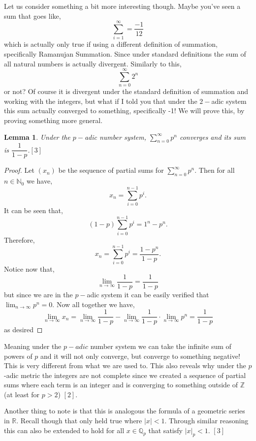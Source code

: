 \documentclass[12pt]{article}
\newtheorem{lem}[thm]{Lemma}
\theoremstyle{definition}
\theoremstyle{remark}
\newcommand{\zz}{\mathbb Z}   %
\newcommand{\qq}{\mathbb Q}   %
\newcommand{\rr}{\mathbb R}   %
\newcommand{\nn}{\mathbb N}   %
\newcommand{\abs}[1]{\left\lvert#1\right\rvert} %
\newcommand{\lrb}[1]{\left[#1\right]}
\begin{document}
    Let us consider something a bit more interesting though. Maybe you've seen a sum that goes like,
    \[\sum_{i=1}^{\infty} = \dfrac{-1}{12}\]
    which is actually only true if using a different definition of summation, specifically Ramanujan Summation. Since under standard definitions the sum of all natural numbers is actually divergent. Similarly to this,
    \[\sum_{n= 0}^{\infty}2^{n}\]
    or not? Of course it is divergent under the standard definition of summation and working with the integers, but what if I told you that under the $2-$adic system this sum actually converged to something, specifically -1! We will prove this, by proving something more general.
    \newpage
    \begin{lem}
      Under the $p-$adic number system, $\sum_{n= 0}^{\infty}p^{n}$ converges and its sum is $\dfrac{1}{1-p}$.$\lrb{3}$
    \end{lem}
    \begin{proof}
      Let $(x_n)$ be the sequence of partial sums for $\sum_{n=0}^{\infty}p^{n}.$ Then for all $n \in \nn_0$ we have,
      \[x_n = \sum_{i = 0}^{n -1}p^{i}.\] It can be seen that,
      \[(1-p)\sum_{i=0}^{n-1}p^{i} = 1^{n} -p^{n}.\]
      Therefore,
      \[x_n = \sum_{i = 0}^{n-1}p^{i} = \dfrac{1-p^{n}}{1-p}.\]
      Notice now that,
      \[\lim_{n\to \infty} \dfrac{1}{1-p} = \dfrac{1}{1-p}\]
      but since we are in the $p-$adic system it can be easily verified that $\lim_{n\to \infty}p^{n} = 0$. Now all together we have,
      \[\lim_{n\to \infty} x_n = \lim_{n\to \infty}\dfrac{1}{1-p} - \lim_{n\to\infty}\dfrac{1}{1-p}\cdot\lim_{n\to\infty}p^{n} = \dfrac{1}{1-p} \]
      as desired
    \end{proof}
    Meaning under the $p-adic$ number system we can take the infinite sum of powers of $p$ and it will not only converge, but converge to something negative! This is very different from what we are used to. This also reveals why under the $p$-adic metric the integers are not complete since we created a sequence of partial sums where each term is an integer and is converging to something outside of $\zz$ (at least for $p> 2$) $\lrb{2}$.

    Another thing to note is that this is analogous the formula of a geometric series in $\rr$. Recall though that only held true where $\abs{x} <1$. Through similar reasoning this can also be extended to hold for all $x\in \qq_p$ that satisfy $\abs{x}_p < 1$. $\lrb{3}$ 
\end{document}
